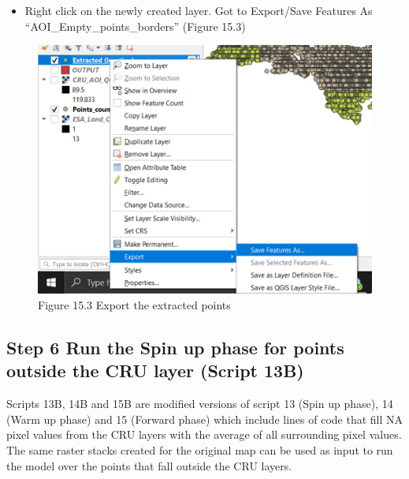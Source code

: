 \documentclass[
  10pt,
  b5paper,
]{book}
\providecommand{\tightlist}{%
  \setlength{\itemsep}{0pt}\setlength{\parskip}{0pt}}
\begin{document}
\begin{itemize}
\tightlist
\item
  Right click on the newly created layer. Got to Export/Save Features As ``AOI\_Empty\_points\_borders'' (Figure 15.3)
\end{itemize}

\begin{figure}
\centering
\includegraphics{images/Figure_13.png}
\caption{Figure 15.3 Export the extracted points}
\end{figure}

\hypertarget{step-6-run-the-spin-up-phase-for-points-outside-the-cru-layer-script-13b}{%
\subsection*{Step 6 Run the Spin up phase for points outside the CRU layer (Script 13B)}\label{step-6-run-the-spin-up-phase-for-points-outside-the-cru-layer-script-13b}}

Scripts 13B, 14B and 15B are modified versions of script 13 (Spin up phase), 14 (Warm up phase) and 15 (Forward phase) which include lines of code that fill NA pixel values from the CRU layers with the average of all surrounding pixel values. The same raster stacks created for the original map can be used as input to run the model over the points that fall outside the CRU layers.
\end{document}
